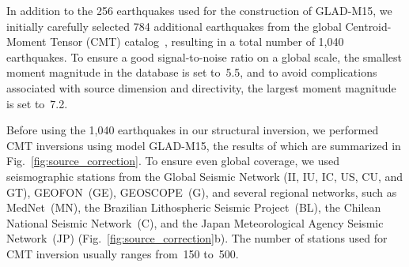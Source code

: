 \documentclass[extra,mreferee]{gji}
\begin{document}
In addition to the 256 earthquakes used for the construction of GLAD-M15, we initially carefully selected 784 additional earthquakes
from the global Centroid-Moment Tensor (CMT) catalog~\citep[e.g.,][]{ekstrom2012global},
resulting in a total number of 1,040 earthquakes.
To ensure a good signal-to-noise ratio on a global scale,
the smallest moment magnitude in the database is set to~5.5,
and to avoid complications associated with source dimension and directivity,
the largest moment magnitude is set to~7.2.

Before using the 1,040 earthquakes in our structural inversion,
we performed CMT inversions using model GLAD-M15,
the results of which are summarized in Fig.~\ref{fig:source_correction}.
To ensure even global coverage,
we used seismographic stations from the  Global Seismic Network (II, IU, IC, US, CU, and GT),
GEOFON~(GE), GEOSCOPE~(G), and several regional networks, such as MedNet~(MN),
the Brazilian Lithospheric Seismic Project~(BL), the Chilean National Seismic Network~(C),
and the Japan Meteorological Agency Seismic Network~(JP) (Fig.~\ref{fig:source_correction}b).
The number of stations used for CMT inversion usually ranges
from~150 to~500.
\end{document}
